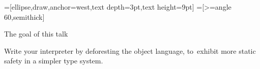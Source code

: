 \documentclass[ucs,professionalfont]{beamer}
\begin{document}

=[ellipse,draw,anchor=west,text depth=3pt,text height=9pt]
=[>=angle 60,semithick]

\begin{frame}{The goal of this talk}
    \begin{center}
        Write your interpreter by deforesting the object language,
        to~exhibit more static safety in a simpler type system.
    \end{center}
\end{frame}

\end{document}
